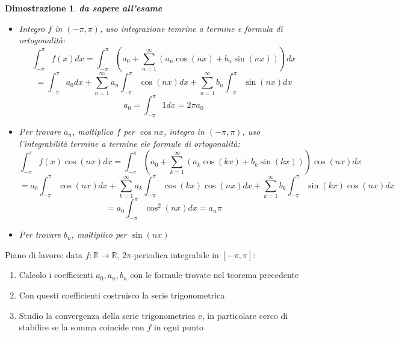 \documentclass{scrreprt}
\newtheorem{demnstrn}{Dimostrazione}
\newenvironment{dimostrazione}{\begin{mdframed}[backgroundcolor=LightCyan1]\begin{demnstrn}}{\end{demnstrn}\end{mdframed}}
\begin{document}
\begin{dimostrazione}
	\emph{\textbf{da sapere all'esame}}
	\begin{itemize}
		\item Integro $f$ in $\left(-\pi,\pi\right)$, uso integrazione temrine a termine e formula di ortogonalità:
			\begin{equation}
				\int_{-\pi}^\pi f(x)dx = \int_{-\pi}^\pi \left(a_0 + \sum_{n=1}^\infty \left(a_n \cos(nx) + b_n \sin(nx)\right)\right)dx
			\end{equation}
			\begin{equation}
				= \int_{-\pi}^\pi a_0dx + \sum_{n=1}^\infty a_n \int_{-\pi}^\pi \cos(nx)dx + \sum_{n=1}^\infty b_n \int_{-\pi}^\pi  \sin(nx)dx
			\end{equation}
			\begin{equation}
				a_0 = \int_{-\pi}^\pi 1dx = 2\pi a_0
			\end{equation}
		\item Per trovare $a_n$, moltiplico $f$ per $\cos{nx}$, integro in $\left(-\pi,\pi\right)$, uso l'integrabilità termine a termine  ele formule di ortogonalità:
			\begin{equation}
				\int_{-\pi}^\pi f(x)\cos(nx)dx = \int_{-\pi}^\pi \left(a_0 + \sum_{k=1}^\infty \left(a_k \cos(kx) + b_k \sin(kx)\right)\right)\cos(nx)dx
			\end{equation}
			\begin{equation}
				= a_0 \int_{-\pi}^\pi \cos(nx)dx + \sum_{k=1}^\infty a_k \int_{-\pi}^\pi \cos(kx)\cos(nx)dx + \sum_{k=1}^\infty b_k \int_{-\pi}^\pi \sin(kx)\cos(nx)dx
			\end{equation}
			\begin{equation}
				= a_0 \int_{-\pi}^\pi \cos^2(nx)dx = a_n\pi
			\end{equation}
		\item Per trovare $b_n$, moltiplico per $\sin{(nx)}$
	\end{itemize}
\end{dimostrazione}

Piano di lavoro: data $f:\mathbb{R}\to\mathbb{R}$, $2\pi$-periodica integrabile in $\left[-\pi,\pi\right]$:
\begin{enumerate}
	\item Calcolo i coefficienti $a_0, a_n, b_n$ con le formule trovate nel teorema precedente
	\item Con questi coefficienti costruisco la serie trigonometrica
	\item Studio la convergenza della serie trigonometrica e, in particolare cerco di stabilire se la somma coincide con $f$ in ogni punto
\end{enumerate}
\end{document}

